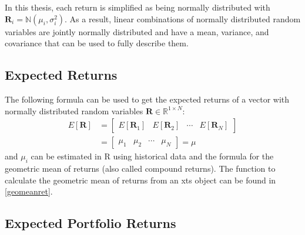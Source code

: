 \documentclass[
  oneside]{book}
\begin{document}
In this thesis, each return is simplified as being normally distributed with \(\pmb{R}_i = \mathbb{N}(\mu_i, \sigma_i^2)\). As a result, linear combinations of normally distributed random variables are jointly normally distributed and have a mean, variance, and covariance that can be used to fully describe them.

\hypertarget{expected-returns}{%
\subsection{Expected Returns}\label{expected-returns}}

The following formula can be used to get the expected returns of a vector with normally distributed random variables \(\pmb{R} \in \mathbb{R}^{1\times N}\):
\begin{align*}
  E[\pmb{R}] &=
  \begin{bmatrix}
    E[\pmb{R}_{1}] & E[\pmb{R}_{2}] & \cdots & E[\pmb{R}_{N}]  
 \end{bmatrix}\\
 &=
 \begin{bmatrix}
    \mu_{1} & \mu_{2} & \cdots & \mu_{N} 
 \end{bmatrix}
 =
 \mu
\end{align*}
and \(\mu_i\) can be estimated in R using historical data and the formula for the geometric mean of returns (also called compound returns). The function to calculate the geometric mean of returns from an xts object can be found in \ref{geomeanret}.

\hypertarget{expected-portfolio-returns}{%
\subsection{Expected Portfolio Returns}\label{expected-portfolio-returns}}
\end{document}
